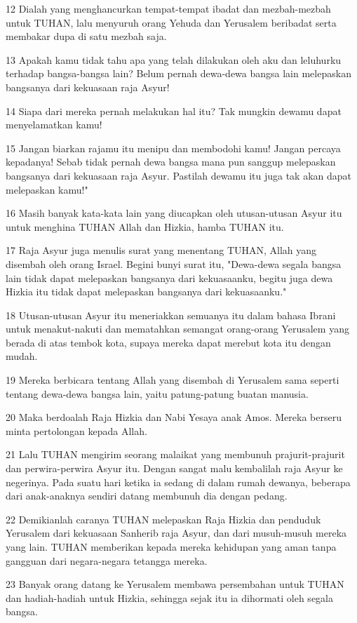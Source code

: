 \par 12 Dialah yang menghancurkan tempat-tempat ibadat dan mezbah-mezbah untuk TUHAN, lalu menyuruh orang Yehuda dan Yerusalem beribadat serta membakar dupa di satu mezbah saja.
\par 13 Apakah kamu tidak tahu apa yang telah dilakukan oleh aku dan leluhurku terhadap bangsa-bangsa lain? Belum pernah dewa-dewa bangsa lain melepaskan bangsanya dari kekuasaan raja Asyur!
\par 14 Siapa dari mereka pernah melakukan hal itu? Tak mungkin dewamu dapat menyelamatkan kamu!
\par 15 Jangan biarkan rajamu itu menipu dan membodohi kamu! Jangan percaya kepadanya! Sebab tidak pernah dewa bangsa mana pun sanggup melepaskan bangsanya dari kekuasaan raja Asyur. Pastilah dewamu itu juga tak akan dapat melepaskan kamu!"
\par 16 Masih banyak kata-kata lain yang diucapkan oleh utusan-utusan Asyur itu untuk menghina TUHAN Allah dan Hizkia, hamba TUHAN itu.
\par 17 Raja Asyur juga menulis surat yang menentang TUHAN, Allah yang disembah oleh orang Israel. Begini bunyi surat itu, "Dewa-dewa segala bangsa lain tidak dapat melepaskan bangsanya dari kekuasaanku, begitu juga dewa Hizkia itu tidak dapat melepaskan bangsanya dari kekuasaanku."
\par 18 Utusan-utusan Asyur itu meneriakkan semuanya itu dalam bahasa Ibrani untuk menakut-nakuti dan mematahkan semangat orang-orang Yerusalem yang berada di atas tembok kota, supaya mereka dapat merebut kota itu dengan mudah.
\par 19 Mereka berbicara tentang Allah yang disembah di Yerusalem sama seperti tentang dewa-dewa bangsa lain, yaitu patung-patung buatan manusia.
\par 20 Maka berdoalah Raja Hizkia dan Nabi Yesaya anak Amos. Mereka berseru minta pertolongan kepada Allah.
\par 21 Lalu TUHAN mengirim seorang malaikat yang membunuh prajurit-prajurit dan perwira-perwira Asyur itu. Dengan sangat malu kembalilah raja Asyur ke negerinya. Pada suatu hari ketika ia sedang di dalam rumah dewanya, beberapa dari anak-anaknya sendiri datang membunuh dia dengan pedang.
\par 22 Demikianlah caranya TUHAN melepaskan Raja Hizkia dan penduduk Yerusalem dari kekuasaan Sanherib raja Asyur, dan dari musuh-musuh mereka yang lain. TUHAN memberikan kepada mereka kehidupan yang aman tanpa gangguan dari negara-negara tetangga mereka.
\par 23 Banyak orang datang ke Yerusalem membawa persembahan untuk TUHAN dan hadiah-hadiah untuk Hizkia, sehingga sejak itu ia dihormati oleh segala bangsa.
